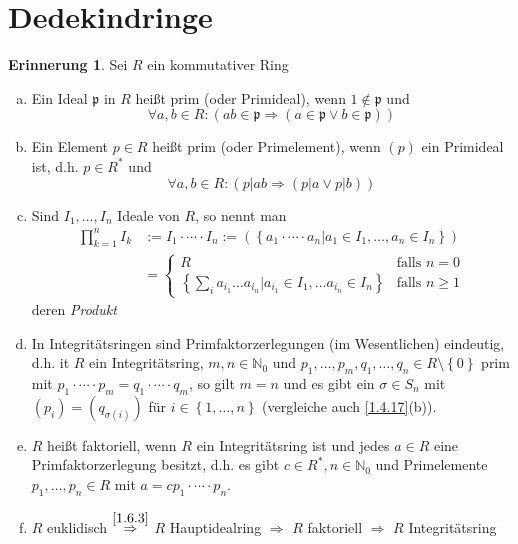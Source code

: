 \documentclass[
twoside=semi,
fontsize=12,
DIV=12, 
cleardoublepage=current,
leqno,
headings=optiontoheadandtoc, 
toc=idx
]{scrbook}
\newcommand{\N}{\mathbb{N}}
\newcommand{\brac}[1]{\left( #1 \right)}
\newcommand{\set}[1]{\left\{ #1 \right\}}
\theoremstyle{definition}
\newtheorem{erinnerung}[definition]{Erinnerung}
\begin{document}
 	\section{Dedekindringe}
 	\begin{erinnerung}\label{2.2.1}
 		Sei $R$ ein kommutativer Ring
 		\begin{enumerate}[(a)]
 			\item Ein Ideal $\mathfrak{p}$ in $R$ hei\ss t prim (oder Primideal), wenn $1\notin \mathfrak{p}$ und
 				\[\forall a,b \in R: (ab \in \mathfrak{p} \Rightarrow (a \in \mathfrak{p} \lor b \in \mathfrak{p}))\]
 			
 			\item Ein Element $p \in R$ hei\ss t prim (oder Primelement), wenn $(p)$ ein Primideal ist, d.h. $p\in R^*$ und
 				\[\forall a,b \in R: (p|ab \Rightarrow (p|a \lor p|b))\]
 			
 			\item Sind $I_1, \dots, I_n$ Ideale von $R$, so nennt man
 			\begin{align*}
 				\prod_{k=1}^n I_k &:= I_1 \cdot \cdots \cdot I_n := \brac{\set{a_1\cdot\cdots\cdot a_n|a_1 \in I_1, \dots, a_n \in I_n}}\\
 				&= \begin{cases}
 					R & \textrm{falls } n = 0\\
 					\set{\sum_i a_{i_1}\dots a_{i_n}| a_{i_1} \in I_1, \dots a_{i_n} \in I_n} & \textrm{falls } n\geq 1
 				\end{cases}
 			\end{align*} 
 			deren \emph{Produkt} 
 			
 			\item In Integrit\"atsringen sind Primfaktorzerlegungen (im Wesentlichen) eindeutig, d.h. it $R$ ein Integrit\"atsring, $m,n \in\N_0$ und $p_1, \dots, p_m, q_1, \dots, q_n \in R\setminus \set{0}$ prim mit $p_1\cdot\cdots\cdot p_m = q_1\cdot\cdots\cdot q_m$, so gilt $m=n$ und es gibt ein $\sigma \in S_n$ mit $(p_i) = (q_{\sigma(i)})$ f\"ur $i \in \set{1,\dots, n}$ (vergleiche auch \ref{1.4.17}(b)).
 			
 			\item $R$ hei\ss t faktoriell, wenn $R$ ein Integrit\"atsring ist und jedes $a \in R$ eine Primfaktorzerlegung besitzt, d.h. es gibt $c \in R^*, n \in \N_0$ und Primelemente $p_1, \dots, p_n \in R$ mit $a = cp_1 \cdot \cdots \cdot p_n$.
 			
 			\item $R$ euklidisch $\overset{\ref{1.6.3}}{\Rightarrow}$ $R$ Hauptidealring $\Rightarrow$ $R$ faktoriell $\Rightarrow$ $R$ Integrit\"atsring  
 		\end{enumerate}
 	\end{erinnerung}
 
\end{document}
